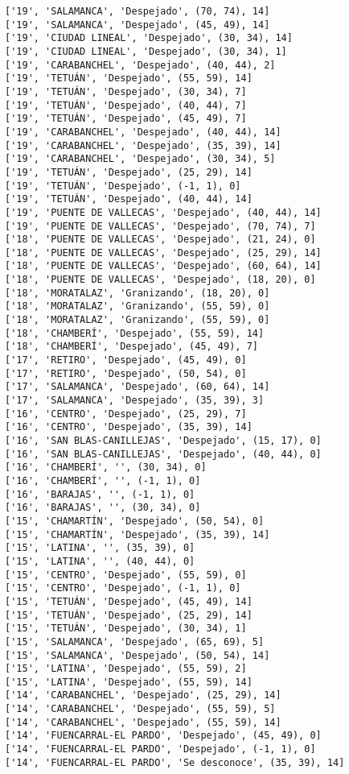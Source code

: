 \documentclass[11pt]{article}
\begin{document}
\begin{Verbatim}[commandchars=\\\{\}]
['19', 'SALAMANCA', 'Despejado', (70, 74), 14]
['19', 'SALAMANCA', 'Despejado', (45, 49), 14]
['19', 'CIUDAD LINEAL', 'Despejado', (30, 34), 14]
['19', 'CIUDAD LINEAL', 'Despejado', (30, 34), 1]
['19', 'CARABANCHEL', 'Despejado', (40, 44), 2]
['19', 'TETUÁN', 'Despejado', (55, 59), 14]
['19', 'TETUÁN', 'Despejado', (30, 34), 7]
['19', 'TETUÁN', 'Despejado', (40, 44), 7]
['19', 'TETUÁN', 'Despejado', (45, 49), 7]
['19', 'CARABANCHEL', 'Despejado', (40, 44), 14]
['19', 'CARABANCHEL', 'Despejado', (35, 39), 14]
['19', 'CARABANCHEL', 'Despejado', (30, 34), 5]
['19', 'TETUÁN', 'Despejado', (25, 29), 14]
['19', 'TETUÁN', 'Despejado', (-1, 1), 0]
['19', 'TETUÁN', 'Despejado', (40, 44), 14]
['19', 'PUENTE DE VALLECAS', 'Despejado', (40, 44), 14]
['19', 'PUENTE DE VALLECAS', 'Despejado', (70, 74), 7]
['18', 'PUENTE DE VALLECAS', 'Despejado', (21, 24), 0]
['18', 'PUENTE DE VALLECAS', 'Despejado', (25, 29), 14]
['18', 'PUENTE DE VALLECAS', 'Despejado', (60, 64), 14]
['18', 'PUENTE DE VALLECAS', 'Despejado', (18, 20), 0]
['18', 'MORATALAZ', 'Granizando', (18, 20), 0]
['18', 'MORATALAZ', 'Granizando', (55, 59), 0]
['18', 'MORATALAZ', 'Granizando', (55, 59), 0]
['18', 'CHAMBERÍ', 'Despejado', (55, 59), 14]
['18', 'CHAMBERÍ', 'Despejado', (45, 49), 7]
['17', 'RETIRO', 'Despejado', (45, 49), 0]
['17', 'RETIRO', 'Despejado', (50, 54), 0]
['17', 'SALAMANCA', 'Despejado', (60, 64), 14]
['17', 'SALAMANCA', 'Despejado', (35, 39), 3]
['16', 'CENTRO', 'Despejado', (25, 29), 7]
['16', 'CENTRO', 'Despejado', (35, 39), 14]
['16', 'SAN BLAS-CANILLEJAS', 'Despejado', (15, 17), 0]
['16', 'SAN BLAS-CANILLEJAS', 'Despejado', (40, 44), 0]
['16', 'CHAMBERÍ', '', (30, 34), 0]
['16', 'CHAMBERÍ', '', (-1, 1), 0]
['16', 'BARAJAS', '', (-1, 1), 0]
['16', 'BARAJAS', '', (30, 34), 0]
['15', 'CHAMARTÍN', 'Despejado', (50, 54), 0]
['15', 'CHAMARTÍN', 'Despejado', (35, 39), 14]
['15', 'LATINA', '', (35, 39), 0]
['15', 'LATINA', '', (40, 44), 0]
['15', 'CENTRO', 'Despejado', (55, 59), 0]
['15', 'CENTRO', 'Despejado', (-1, 1), 0]
['15', 'TETUÁN', 'Despejado', (45, 49), 14]
['15', 'TETUÁN', 'Despejado', (25, 29), 14]
['15', 'TETUÁN', 'Despejado', (30, 34), 1]
['15', 'SALAMANCA', 'Despejado', (65, 69), 5]
['15', 'SALAMANCA', 'Despejado', (50, 54), 14]
['15', 'LATINA', 'Despejado', (55, 59), 2]
['15', 'LATINA', 'Despejado', (55, 59), 14]
['14', 'CARABANCHEL', 'Despejado', (25, 29), 14]
['14', 'CARABANCHEL', 'Despejado', (55, 59), 5]
['14', 'CARABANCHEL', 'Despejado', (55, 59), 14]
['14', 'FUENCARRAL-EL PARDO', 'Despejado', (45, 49), 0]
['14', 'FUENCARRAL-EL PARDO', 'Despejado', (-1, 1), 0]
['14', 'FUENCARRAL-EL PARDO', 'Se desconoce', (35, 39), 14]

\end{Verbatim}
\end{document}
